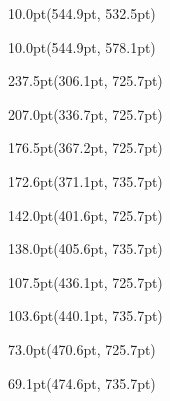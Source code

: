 \documentclass{article}
\begin{document}
\begin{textblock*}{10.0pt}(544.9pt, 532.5pt)%
\noindent%
%
\end{textblock*}
\begin{textblock*}{10.0pt}(544.9pt, 578.1pt)%
\noindent%
%
\end{textblock*}
\begin{textblock*}{237.5pt}(306.1pt, 725.7pt)%
\noindent%
%
\end{textblock*}
\begin{textblock*}{207.0pt}(336.7pt, 725.7pt)%
\noindent%
%
\end{textblock*}
\begin{textblock*}{176.5pt}(367.2pt, 725.7pt)%
\noindent%
%
\end{textblock*}
\begin{textblock*}{172.6pt}(371.1pt, 735.7pt)%
\noindent%
%
\end{textblock*}
\begin{textblock*}{142.0pt}(401.6pt, 725.7pt)%
\noindent%
%
\end{textblock*}
\begin{textblock*}{138.0pt}(405.6pt, 735.7pt)%
\noindent%
%
\end{textblock*}
\begin{textblock*}{107.5pt}(436.1pt, 725.7pt)%
\noindent%
%
\end{textblock*}
\begin{textblock*}{103.6pt}(440.1pt, 735.7pt)%
\noindent%
%
\end{textblock*}
\begin{textblock*}{73.0pt}(470.6pt, 725.7pt)%
\noindent%
%
\end{textblock*}
\begin{textblock*}{69.1pt}(474.6pt, 735.7pt)%
\noindent%
%
\end{textblock*}
\end{document}
